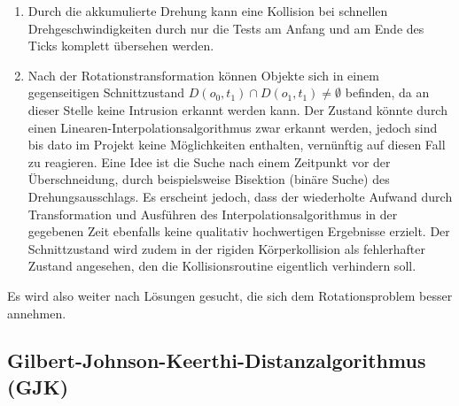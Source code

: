 \begin{enumerate}
\item Durch die akkumulierte Drehung kann eine Kollision bei schnellen Drehgeschwindigkeiten durch nur die Tests am Anfang und am Ende des Ticks komplett übersehen werden.
\item Nach der Rotationstransformation können Objekte sich in einem gegenseitigen Schnittzustand $D(o_0, t_1)\cap D(o_1, t_1) \neq \emptyset$ befinden, da an dieser Stelle keine Intrusion erkannt werden kann. Der Zustand könnte durch einen Linearen-Interpolationsalgorithmus zwar erkannt werden, jedoch sind bis dato im Projekt keine Möglichkeiten enthalten, vernünftig auf diesen Fall zu reagieren.
Eine Idee ist die Suche nach einem Zeitpunkt vor der Überschneidung, durch beispielsweise Bisektion (binäre Suche) des Drehungsausschlags. Es erscheint jedoch, dass der wiederholte Aufwand durch Transformation und Ausführen des Interpolationsalgorithmus in der gegebenen Zeit ebenfalls keine qualitativ hochwertigen Ergebnisse erzielt. Der Schnittzustand wird zudem in der rigiden Körperkollision als fehlerhafter Zustand angesehen, den die Kollisionsroutine eigentlich verhindern soll.
\end{enumerate}

Es wird also weiter nach Lösungen gesucht, die sich dem Rotationsproblem besser annehmen.

\subsection{Gilbert-Johnson-Keerthi-Distanzalgorithmus (GJK)}
\label{sec:gjk}

